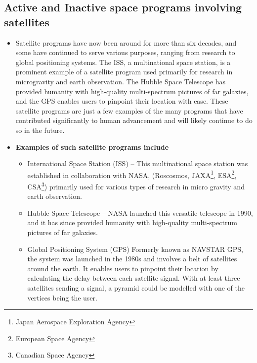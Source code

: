 \documentclass{article}
\begin{document}
    \subsection{Active and Inactive space programs involving satellites}
        \begin{itemize}
            \item[] Satellite programs have now been around for more than six decades, and some have continued to serve various purposes, ranging from research to global positioning systems. The ISS, a multinational space station, is a prominent example of a satellite program used primarily for research in microgravity and earth observation. The Hubble Space Telescope has provided humanity with high-quality multi-spectrum pictures of far galaxies, and the GPS enables users to pinpoint their location with ease. These satellite programs are just a few examples of the many programs that have contributed significantly to human advancement and will likely continue to do so in the future.

            \item[] \textbf{Examples of such satellite programs include}
            \begin{itemize}
                \item International Space Station (ISS) -- This multinational space station was established in collaboration with NASA, (Roscosmos, JAXA\footnote{Japan Aerospace Exploration Agency}, ESA\footnote{European Space Agency}, CSA\footnote{Canadian Space Agency}) primarily used for various types of research in micro gravity and earth observation.
                \item Hubble Space Telescope -- NASA launched this versatile telescope in 1990, and it has since provided humanity with high-quality multi-spectrum pictures of far galaxies.
                \item Global Positioning System (GPS) Formerly known as NAVSTAR GPS, the system was launched in the 1980s and involves a belt of satellites around the earth. It enables users to pinpoint their location by calculating the delay between each satellite signal. With at least three satellites sending a signal, a pyramid could be modelled with one of the vertices being the user.
            \end{itemize}
        \end{itemize}
\end{document}
